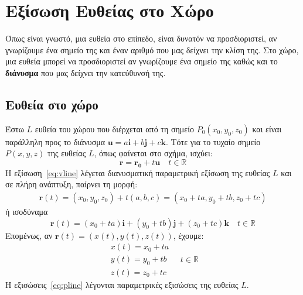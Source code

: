 



\pagestyle{vangelis}
\everymath{\displaystyle}
\setcounter{chapter}{1}




\chapter*{Εξίσωση Ευθείας στο Χώρο}

Όπως είναι γνωστό, μια ευθεία στο επίπεδο, είναι δυνατόν να προσδιοριστεί, αν γνωρίζουμε
ένα σημείο της και έναν αριθμό που μας δείχνει την κλίση της. 
Στο χώρο, μια ευθεία μπορεί να προσδιοριστεί αν γνωρίζουμε ένα σημείο της
καθώς και το \textbf{διάνυσμα} που μας δείχνει την κατεύθυνσή της.

\section*{Ευθεία στο χώρο}

Έστω $L$ ευθεία του χώρου που διέρχεται από τη σημείο $ P_{0}(x_{0}, y_{0}, z_{0}) $ 
και είναι παράλληλη προς το διάνυσμα 
$ \mathbf{u} = a \mathbf{i} + b \mathbf{j} + c \mathbf{k} $. Τότε για το 
τυχαίο σημείο $ P(x,y,z) $ της ευθείας $L$, όπως φαίνεται στο σχήμα, ισχύει:
\begin{equation}\label{eq:vline}
  \mathbf{r} = \mathbf{r_{0}} + t \mathbf{u} \quad t \in \mathbb{R}
\end{equation}
Η εξίσωση~\eqref{eq:vline} λέγεται \textcolor{Col1}{διανυσματική παραμετρική} εξίσωση 
της ευθείας $L$  και σε πλήρη ανάπτυξη, παίρνει τη μορφή:
\begin{align*} 
  \mathbf{r}(t) = (x_{0}, y_{0}, z_{0}) + t (a, b, c) 
  = (x_{0} + t a, y_{0}+ t b, z_{0} + t c) 
\end{align*} 
ή ισοδύναμα 
\[
  \boxed{\mathbf{r}(t) = (x_{0}+ t a) \mathbf{i} + (y_{0} + t b) \mathbf{j}+
  (z_{0}+ t c) \mathbf{k}} \quad t \in \mathbb{R} 
\]
Επομένως, αν $ \mathbf{r}(t) = (x(t), y(t), z(t)) $, έχουμε:
\begin{equation}\label{eq:pline}
  \boxed{
    \begin{matrix}
      x(t) = x_{0} + t a \\
      y(t) = y_{0} + t b \\
      z(t) = z_{0} + t c
    \end{matrix}
  } 
  \quad t \in \mathbb{R} 
\end{equation} 
Η εξισώσεις~\eqref{eq:pline} λέγονται \textcolor{Col1}{παραμετρικές εξισώσεις} της 
ευθείας $L$.

